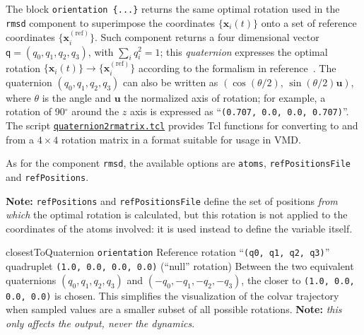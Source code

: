 The block \texttt{orientation~\{...\}} returns the
same optimal rotation used in the \texttt{rmsd} component to
superimpose the coordinates $\{\mathbf{x}_{i}(t)\}$ onto a set of
reference coordinates $\{\mathbf{x}_{i}^{\mathrm{(ref)}}\}$.  Such
component returns a four dimensional vector $\mathsf{q} = (q_0, q_1,
q_2, q_3)$, with $\sum_{i} q_{i}^{2} = 1$; this \emph{quaternion}
expresses the optimal rotation $\{\mathbf{x}_{i}(t)\} \rightarrow
\{\mathbf{x}_{i}^{\mathrm{(ref)}}\}$ according to the formalism in
reference~\cite{Coutsias2004}.  The quaternion $(q_0, q_1, q_2, q_3)$
can also be written as $\left(\cos(\theta/2), \,
  \sin(\theta/2)\mathbf{u}\right)$, where $\theta$ is the angle and
$\mathbf{u}$ the normalized axis of rotation; for example, a rotation
of 90$^{\circ}$ around the $z$ axis is expressed as
``\texttt{(0.707, 0.0, 0.0, 0.707)}''.  The script
\href{https://raw.githubusercontent.com/Colvars/colvars/master/colvartools/quaternion2rmatrix.tcl}{\texttt{quaternion2rmatrix.tcl}} provides Tcl functions for converting
to and from a $4\times{}4$ rotation matrix in a format suitable for
usage in VMD.

As for the component \texttt{rmsd}, the available options are \texttt{atoms}, \texttt{refPositionsFile} and \texttt{refPositions}.

\textbf{Note:} \texttt{refPositions} and \texttt{refPositionsFile} define the set of positions \emph{from which} the optimal rotation is calculated, but this rotation is not applied to the coordinates of the atoms involved: it is used instead to define the variable itself.

\begin{cvcoptions}
\item %
\item %
\item %


\item %
  \keydef
    {closestToQuaternion}{%
    \texttt{orientation}}{%
    Reference rotation}{%
    ``\texttt{(q0, q1, q2, q3)}'' quadruplet}{%
    \texttt{(1.0, 0.0, 0.0, 0.0)} (``null'' rotation)}{%
    Between the two equivalent quaternions $(q_0, q_1, q_2, q_3)$ and
    $(-q_0, -q_1, -q_2, -q_3)$, the closer to \texttt{(1.0, 0.0, 0.0,
      0.0)} is chosen.  This simplifies the visualization of the
    colvar trajectory when sampled values are a smaller subset of all
    possible rotations.  \textbf{Note:} \emph {this only affects the
      output, never the dynamics}.}

\end{cvcoptions}

